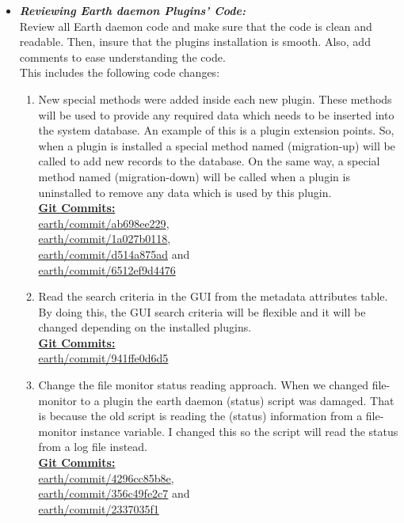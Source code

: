\documentclass{article}
\begin{document}
\begin{itemize}
	\item \textit{\textbf{Reviewing Earth daemon Plugins' Code:}}\\
Review all Earth daemon code and make sure that the code is clean and readable. Then, insure that the plugins installation is smooth. Also, add comments to ease understanding the code.\\
This includes the following code changes:
\begin{enumerate}
\item New special methods were added inside each new plugin. These methods will be used to provide any required data which needs to be inserted into the system database. An example of this is a plugin extension points. So, when a plugin is installed a special method named (migration-up) will be called to add new records to the database. On the same way, a special method named (migration-down) will be called when a plugin is uninstalled to remove any data which is used by this plugin. \\
\underline{\textbf{Git Commits: }} \\
\href{http://github.com/Jonv/earth/commit/ab698ee229}{earth/commit/ab698ee229}, \\
\href{http://github.com/Jonv/earth/commit/1a027b0118}{earth/commit/1a027b0118}, \\
\href{http://github.com/Jonv/earth/commit/d514a875ad}{earth/commit/d514a875ad} and \\
\href{http://github.com/Jonv/earth/commit/6512ef9d4476}{earth/commit/6512ef9d4476}

\item Read the search criteria in the GUI from the metadata attributes table. By doing this, the GUI search criteria will be flexible and it will be changed depending on the installed plugins.\\
\underline{\textbf{Git Commits: }} \\
\href{http://github.com/Jonv/earth/commit/941ffe0d6d5}{earth/commit/941ffe0d6d5}



\item Change the file monitor status reading approach. When we changed file-monitor to a plugin the earth daemon (status) script was damaged. That is because the old script is reading the (status) information from a file-monitor instance variable. I changed this so the script will read the status from a log file instead.\\
\underline{\textbf{Git Commits: }} \\
\href{http://github.com/Jonv/earth/commit/4296cc85b8e}{earth/commit/4296cc85b8e},\\
\href{http://github.com/Jonv/earth/commit/356c49fe2c7}{earth/commit/356c49fe2c7} and\\
\href{http://github.com/Jonv/earth/commit/2337035f1}{earth/commit/2337035f1}\\


\end{enumerate}
\end{itemize}
\end{document}
